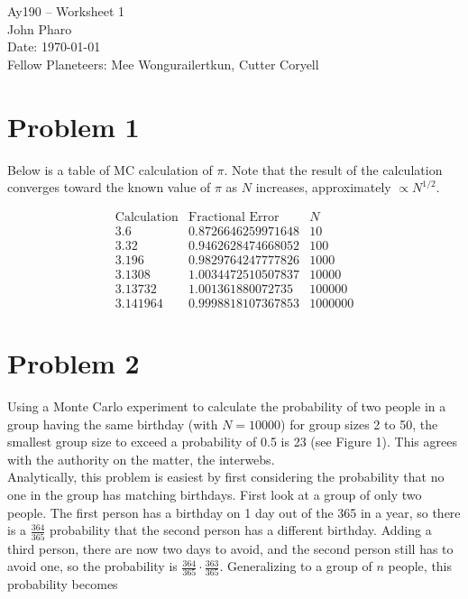 \documentclass[11pt,letterpaper]{article}
\begin{document}
\begin{center}
\Large
Ay190 -- Worksheet 1\\
John Pharo\\
Date: \today\\
Fellow Planeteers: Mee Wongurailertkun, Cutter Coryell
\end{center}

\section*{Problem 1}

Below is a table of MC calculation of $\pi$. Note that the result of the calculation converges toward the known value of $\pi$ as $N$ increases, approximately $\propto N^{1/2}$. 

\[
\begin{array}{ccc}
\text{Calculation} & \text{Fractional Error} & N \\
3.6 & 0.8726646259971648 & 10 \\
3.32 & 0.9462628474668052 & 100 \\
3.196 & 0.9829764247777826 & 1000 \\
3.1308 & 1.0034472510507837 & 10000 \\
3.13732 & 1.001361880072735 & 100000 \\
3.141964 & 0.9998818107367853 & 1000000
\end{array}
\]

\section*{Problem 2}

Using a Monte Carlo experiment to calculate the probability of two people in a group having the same birthday (with $N=10000$) for group sizes 2 to 50, the smallest group size to exceed a probability of 0.5 is 23 (see Figure 1). This agrees with the authority on the matter, the interwebs. \\

Analytically, this problem is easiest by first considering the probability that no one in the group has matching birthdays. First look at a group of only two people. The first person has a birthday on 1 day out of the 365 in a year, so there is a $\frac{364}{365}$ probability that the second person has a different birthday. Adding a third person, there are now two days to avoid, and the second person still has to avoid one, so the probability is $\frac{364}{365} \cdot \frac{363}{365}$. Generalizing to a group of $n$ people, this probability becomes
\end{document}
